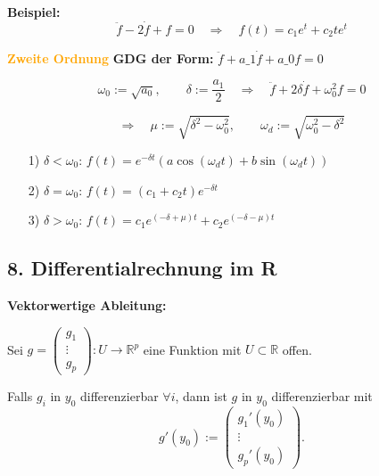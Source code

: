 \textbf{Beispiel:} \quad
\[
\ddot{f} - 2\dot{f} + f = 0 \quad \Rightarrow \quad f(t) = c_1 e^t + c_2 t e^t
\]

\vspace{1em}

\textcolor{orange}{\textbf{Zweite Ordnung}} \quad
\textbf{GDG der Form:} \quad $\ddot{f} + a\_1 \dot{f} + a\_0 f = 0$ \qquad {}

\[
\omega_0 := \sqrt{a_0}, \qquad \delta := \frac{a_1}{2}
\quad \Rightarrow \quad
\ddot{f} + 2\delta \dot{f} + \omega_0^2 f = 0
\]

\[
\Rightarrow \quad \mu := \sqrt{\delta^2 - \omega_0^2}, \qquad \omega_d := \sqrt{\omega_0^2 - \delta^2}
\]

\begin{itemize}
  \item[1)] \( \delta < \omega_0 \): \quad
    \( f(t) = e^{-\delta t} \left( a \cos(\omega_d t) + b \sin(\omega_d t) \right) \)

  \item[2)] \( \delta = \omega_0 \): \quad
    \( f(t) = (c_1 + c_2 t) e^{-\delta t} \)

  \item[3)] \( \delta > \omega_0 \): \quad
    \( f(t) = c_1 e^{(-\delta + \mu)t} + c_2 e^{(-\delta - \mu)t} \)
\end{itemize}


\subsection{8. Differentialrechnung im R}

\textbf{Vektorwertige Ableitung:}

Sei $g = \begin{pmatrix} g_1 \\ \vdots \\ g_p \end{pmatrix} : U \to \mathbb{R}^p$ eine Funktion mit $U \subset \mathbb{R}$ offen. 

\vspace{2pt}

Falls $g_i$ in $y_0$ differenzierbar $\forall i$, dann ist $g$ in $y_0$ differenzierbar mit
\[
g'(y_0) := \begin{pmatrix} g_1'(y_0) \\ \vdots \\ g_p'(y_0) \end{pmatrix}.
\]

